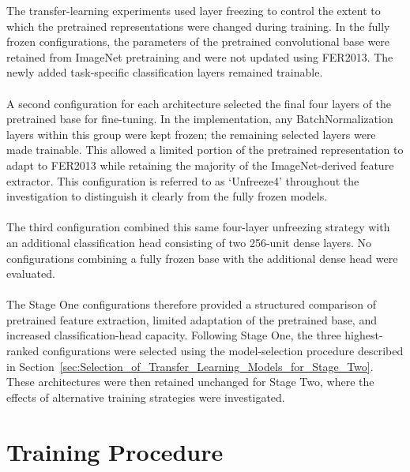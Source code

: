 \documentclass[12pt, a4paper]{report}
\let\oldsection\section
\renewcommand{\section}{%
    \Needspace{6\baselineskip}%
    \oldsection
}
\begin{document}
				The transfer-learning experiments used layer freezing to control the extent to which the pretrained representations were changed during training. In the fully frozen configurations, the parameters of the pretrained convolutional base were retained from ImageNet pretraining and were not updated using FER2013. The newly added task-specific classification layers remained trainable.\\\\
				A second configuration for each architecture selected the final four layers of the pretrained base for fine-tuning. In the implementation, any BatchNormalization layers within this group were kept frozen; the remaining selected layers were made trainable. This allowed a limited portion of the pretrained representation to adapt to FER2013 while retaining the majority of the ImageNet-derived feature extractor. This configuration is referred to as `Unfreeze4' throughout the investigation to distinguish it clearly from the fully frozen models.\\\\
				The third configuration combined this same four-layer unfreezing strategy with an additional classification head consisting of two 256-unit dense layers. No configurations combining a fully frozen base with the additional dense head were evaluated.\\\\
				The Stage One configurations therefore provided a structured comparison of pretrained feature extraction, limited adaptation of the pretrained base, and increased classification-head capacity. Following Stage One, the three highest-ranked configurations were selected using the model-selection procedure described in Section~\ref{sec:Selection_of_Transfer_Learning_Models_for_Stage_Two}. These architectures were then retained unchanged for Stage Two, where the effects of alternative training strategies were investigated.
				
		\section{Training Procedure}
			
\end{document}
